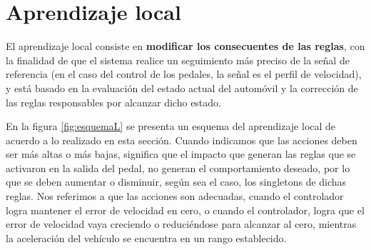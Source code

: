 

\section{Aprendizaje local} 
\label{sec:aprendizajeL}


El aprendizaje local consiste en \textbf{modificar los consecuentes de las reglas}, con la finalidad de que el sistema realice un seguimiento más preciso de la señal de referencia (en el caso del control de los pedales, la señal es el perfil de velocidad), y está basado en la evaluación del estado actual del automóvil y la corrección de las reglas responsables por alcanzar dicho estado. 

En la figura \ref{fig:esquemaL} se presenta un esquema del aprendizaje local de acuerdo a lo realizado en esta sección. Cuando indicamos que las acciones deben ser más altas o más bajas, significa que el impacto que generan las reglas que se activaron en la salida del pedal, no generan el comportamiento deseado, por lo que se deben aumentar o disminuir, según sea el caso, los singletons de dichas reglas. Nos referimos a que las acciones son adecuadas, cuando el controlador logra mantener el error de velocidad en cero, o cuando el controlador, logra que el error de velocidad vaya creciendo o reduciéndose para alcanzar al cero, mientras la aceleración del vehículo se encuentra en un rango establecido. 

